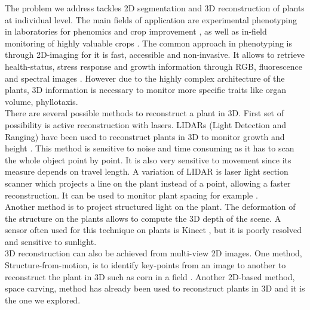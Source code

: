 
The problem we address tackles 2D segmentation and 3D reconstruction of plants at individual level. The main fields of application  are experimental phenotyping in laboratories for phenomics and crop improvement \cite{tisne_phenoscope:_2013,perez-sanz_plant_2017}, as well as in-field monitoring of highly valuable crops \cite{hoffmann_fluorescence_2015, fiorani_future_2013}. The common approach in phenotyping is through 2D-imaging for it is fast, accessible and non-invasive. It allows to retrieve health-status, stress response and growth information through RGB, fluorescence and spectral images \cite{li_review_2014}. However due to the highly complex architecture of the plants, 3D information is necessary to monitor more specific traits like organ volume, phyllotaxis. \\
There are several possible methods to reconstruct a plant in 3D. First set of possibility is active reconstruction with lasers. LIDARs (Light Detection and Ranging) have been used to reconstruct plants in 3D to monitor growth and height \cite{garrido_3d_2015}. This method is sensitive to noise and time consuming as it has to scan the whole object point by point. It is also very sensitive to movement since its measure depends on travel length. A variation of LIDAR is laser light section scanner which projects a line on the plant instead of a point, allowing a faster reconstruction. It can be used to monitor plant spacing for example \cite{shi_automatic_2013}. \\
Another method is to project structured light on the plant. The deformation of the structure on the plants allows to compute the 3D depth of the scene. A sensor often used for this technique on plants is Kinect \cite{paulus_low-cost_2014, nguyen_structured_2015}, but it is poorly resolved and sensitive to sunlight.\\
3D reconstruction can also be achieved from multi-view 2D images. One method, Structure-from-motion, is to identify key-points from an image to another to reconstruct the plant in 3D such as corn in a field \cite{sodhi_-field_2017}. Another 2D-based method, space carving, method \cite{kutulakos_theory_1999} has already been used to reconstruct plants in 3D \cite{schonberger_structure--motion_2016} and it is the one we explored.\\
